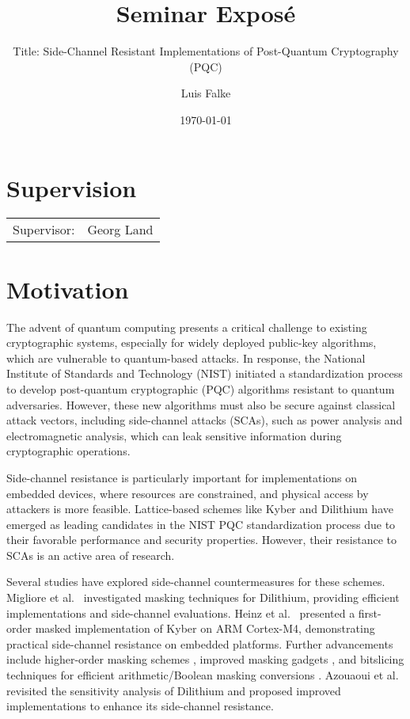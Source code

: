 \documentclass{scrartcl}
\title{Seminar Exposé}
\subtitle{Title: Side-Channel Resistant Implementations of Post-Quantum Cryptography (PQC)}
\author{Luis Falke}
\date{\today}
\begin{document}
\maketitle

\section*{Supervision}
\begin{tabular}{ll}
	Supervisor: & Georg Land \\
\end{tabular}

\section*{Motivation}
The advent of quantum computing presents a critical challenge to existing cryptographic systems, especially for widely deployed public-key algorithms, which are vulnerable to quantum-based attacks. In response, the National Institute of Standards and Technology (NIST) initiated a standardization process to develop post-quantum cryptographic (PQC) algorithms resistant to quantum adversaries. However, these new algorithms must also be secure against classical attack vectors, including side-channel attacks (SCAs), such as power analysis and electromagnetic analysis, which can leak sensitive information during cryptographic operations.

Side-channel resistance is particularly important for implementations on embedded devices, where resources are constrained, and physical access by attackers is more feasible. Lattice-based schemes like Kyber and Dilithium have emerged as leading candidates in the NIST PQC standardization process due to their favorable performance and security properties. However, their resistance to SCAs is an active area of research.

Several studies have explored side-channel countermeasures for these schemes. Migliore et al.\ \cite{Migliore19} investigated masking techniques for Dilithium, providing efficient implementations and side-channel evaluations. Heinz et al.\ \cite{Heinz20} presented a first-order masked implementation of Kyber on ARM Cortex-M4, demonstrating practical side-channel resistance on embedded platforms. Further advancements include higher-order masking schemes \cite{Bos21}, improved masking gadgets \cite{Coron23}, and bitslicing techniques for efficient arithmetic/Boolean masking conversions \cite{Bronchain22}. Azouaoui et al.\ \cite{Azouaoui22} revisited the sensitivity analysis of Dilithium and proposed improved implementations to enhance its side-channel resistance.
\end{document}
